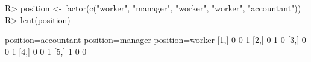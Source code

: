 \begin{Schunk}
% --begin: "lcut.factor"
\begin{Sinput}
R> position <- factor(c("worker", "manager", "worker", "worker", "accountant"))
R> lcut(position)
\end{Sinput}
\begin{Soutput}
     position=accountant position=manager position=worker
[1,]                   0                0               1
[2,]                   0                1               0
[3,]                   0                0               1
[4,]                   0                0               1
[5,]                   1                0               0
\end{Soutput}
%
% --end: "lcut.factor"
\end{Schunk}

